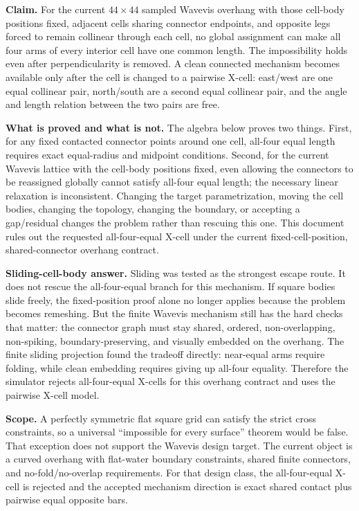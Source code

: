 \documentclass[11pt,letterpaper]{article}
\begin{document}
\textbf{Claim.} For the current \(44\times44\) sampled Wavevis overhang with those cell-body positions fixed, adjacent cells sharing connector endpoints, and opposite legs forced to remain collinear through each cell, no global assignment can make all four arms of every interior cell have one common length. The impossibility holds even after perpendicularity is removed. A clean connected mechanism becomes available only after the cell is changed to a pairwise X-cell: east/west are one equal collinear pair, north/south are a second equal collinear pair, and the angle and length relation between the two pairs are free.

\textbf{What is proved and what is not.} The algebra below proves two things. First, for any fixed contacted connector points around one cell, all-four equal length requires exact equal-radius and midpoint conditions. Second, for the current Wavevis lattice with the cell-body positions fixed, even allowing the connectors to be reassigned globally cannot satisfy all-four equal length; the necessary linear relaxation is inconsistent. Changing the target parametrization, moving the cell bodies, changing the topology, changing the boundary, or accepting a gap/residual changes the problem rather than rescuing this one. This document rules out the requested all-four-equal X-cell under the current fixed-cell-position, shared-connector overhang contract.

\textbf{Sliding-cell-body answer.} Sliding was tested as the strongest escape route. It does not rescue the all-four-equal branch for this mechanism. If square bodies slide freely, the fixed-position proof alone no longer applies because the problem becomes remeshing. But the finite Wavevis mechanism still has the hard checks that matter: the connector graph must stay shared, ordered, non-overlapping, non-spiking, boundary-preserving, and visually embedded on the overhang. The finite sliding projection found the tradeoff directly: near-equal arms require folding, while clean embedding requires giving up all-four equality. Therefore the simulator rejects all-four-equal X-cells for this overhang contract and uses the pairwise X-cell model.

\textbf{Scope.} A perfectly symmetric flat square grid can satisfy the strict cross constraints, so a universal ``impossible for every surface'' theorem would be false. That exception does not support the Wavevis design target. The current object is a curved overhang with flat-water boundary constraints, shared finite connectors, and no-fold/no-overlap requirements. For that design class, the all-four-equal X-cell is rejected and the accepted mechanism direction is exact shared contact plus pairwise equal opposite bars.
\end{document}
